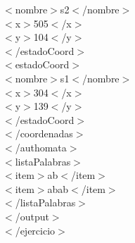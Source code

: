 \documentclass[12pt,a4paper,spanish]{book}
\begin{document}
{\indent $<$nombre$>$s2$<$/nombre$>$\\

\indent $<$x$>$505$<$/x$>$\\

\indent $<$y$>$104$<$/y$>$\\

$<$/estadoCoord$>$ \\

$<$estadoCoord$>$\\

\indent $<$nombre$>$s1$<$/nombre$>$\\

\indent $<$x$>$304$<$/x$>$\\

\indent $<$y$>$139$<$/y$>$\\

$<$/estadoCoord$>$\\

$<$/coordenadas$>$\\

$<$/authomata$>$\\

\indent $<$listaPalabras$>$\\

\indent \indent $<$item$>$ab$<$/item$>$\\

\indent \indent $<$item$>$abab$<$/item$>$\\

\indent $<$/listaPalabras$>$\\

$<$/output$>$\\

$<$/ejercicio$>$\\

}
\end{document}
